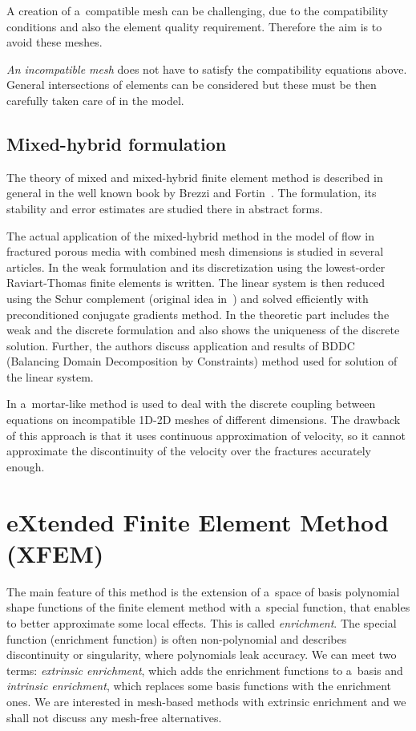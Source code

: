 \documentclass[FM,Dis]{tulthesis}
\begin{document}
A creation of a~compatible mesh can be challenging, due to the compatibility conditions and also the
element quality requirement. Therefore the aim is to avoid these meshes.

\emph{An incompatible mesh} does not have to satisfy the compatibility equations above. 
General intersections of elements can be considered but these must be then carefully taken care of in the model.


\subsection{Mixed-hybrid formulation}
The theory of mixed and mixed-hybrid finite element method is described in general in the well known book by 
Brezzi and Fortin~\cite{brezzi_mixed_1991}. 
The formulation, its stability and error estimates are studied there in abstract forms.

The actual application of the mixed-hybrid method in the model of flow in fractured porous 
media with combined mesh dimensions is studied in several articles.
In \cite{brezina_mixed-hybrid_2010} the weak formulation and its discretization using the lowest-order Raviart-Thomas finite 
elements is written. The linear system is then reduced using the Schur complement (original idea in~\cite{maryska_mixed-hybrid_1995})
and solved efficiently with preconditioned conjugate gradients method.
In \cite{sistek_bddc_2015} the theoretic part includes the weak and the discrete formulation and also shows
the uniqueness of the discrete solution. Further, the authors discuss application and results of BDDC 
(Balancing Domain Decomposition by Constraints) method used for solution of the linear system.

In \cite{brezina_2012} a~mortar-like method is used to deal with the discrete coupling between equations on incompatible 1D-2D meshes 
of different dimensions. The drawback of this approach is that it uses continuous approximation of velocity, so
it cannot approximate the discontinuity of the velocity over the fractures accurately enough.


\section{eXtended Finite Element Method (XFEM)} \label{sec:soa_xfem}

The main feature of this method is the extension of a~space of basis polynomial shape functions of the finite element
method with a~special function, that enables to better approximate some local effects. This is called \emph{enrichment}.
The special function (enrichment function) is often non-polynomial and describes discontinuity or singularity,
where polynomials leak accuracy. We can meet two terms: \emph{extrinsic enrichment}, which adds the enrichment
functions to a~basis and \emph{intrinsic enrichment}, which replaces some basis functions with the enrichment ones.
We are interested in mesh-based methods with extrinsic enrichment and we shall not discuss any mesh-free alternatives.
\end{document}
